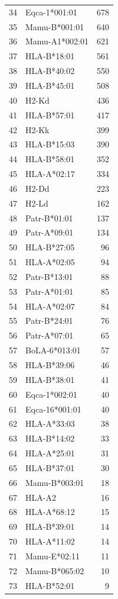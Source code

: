 \begin{longtable}{r l r}
34 & Eqca-1*001:01 & 678 \\
35 & Mamu-B*001:01 & 640 \\
36 & Mamu-A1*002:01 & 621 \\
37 & HLA-B*18:01 & 561 \\
38 & HLA-B*40:02 & 550 \\
39 & HLA-B*45:01 & 508 \\
40 & H2-Kd & 436 \\
41 & HLA-B*57:01 & 417 \\
42 & H2-Kk & 399 \\
43 & HLA-B*15:03 & 390 \\
44 & HLA-B*58:01 & 352 \\
45 & HLA-A*02:17 & 334 \\
46 & H2-Dd & 223 \\
47 & H2-Ld & 162 \\
48 & Patr-B*01:01 & 137 \\
49 & Patr-A*09:01 & 134 \\
50 & HLA-B*27:05 & 96 \\
51 & HLA-A*02:05 & 94 \\
52 & Patr-B*13:01 & 88 \\
53 & Patr-A*01:01 & 85 \\
54 & HLA-A*02:07 & 84 \\
55 & Patr-B*24:01 & 76 \\
56 & Patr-A*07:01 & 65 \\
57 & BoLA-6*013:01 & 57 \\
58 & HLA-B*39:06 & 46 \\
59 & HLA-B*38:01 & 41 \\
60 & Eqca-1*002:01 & 40 \\
61 & Eqca-16*001:01 & 40 \\
62 & HLA-A*33:03 & 38 \\
63 & HLA-B*14:02 & 33 \\
64 & HLA-A*25:01 & 31 \\
65 & HLA-B*37:01 & 30 \\
66 & Mamu-B*003:01 & 18 \\
67 & HLA-A2 & 16 \\
68 & HLA-A*68:12 & 15 \\
69 & HLA-B*39:01 & 14 \\
70 & HLA-A*11:02 & 14 \\
71 & Mamu-E*02:11 & 11 \\
72 & Mamu-B*065:02 & 10 \\
73 & HLA-B*52:01 & 9 \\

\end{longtable}

